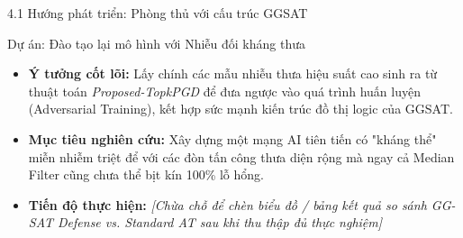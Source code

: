 \documentclass[10pt, xcolor=table]{beamer}
\begin{document}
\begin{frame}{4.1 Hướng phát triển: Phòng thủ với cấu trúc GGSAT}
    \begin{block}{Dự án: Đào tạo lại mô hình với Nhiễu đối kháng thưa}
        \begin{itemize}
            \item \textbf{Ý tưởng cốt lõi:} Lấy chính các mẫu nhiễu thưa hiệu suất cao sinh ra từ thuật toán \textit{Proposed-TopkPGD} để đưa ngược vào quá trình huấn luyện (Adversarial Training), kết hợp sức mạnh kiến trúc đồ thị logic của GGSAT.
            \item \textbf{Mục tiêu nghiên cứu:} Xây dựng một mạng AI tiên tiến có "kháng thể" miễn nhiễm triệt để với các đòn tấn công thưa diện rộng mà ngay cả Median Filter cũng chưa thể bịt kín 100\% lỗ hổng.
            \item \textbf{Tiến độ thực hiện:} \textit{[Chừa chỗ để chèn biểu đồ / bảng kết quả so sánh GG-SAT Defense vs. Standard AT sau khi thu thập đủ thực nghiệm]}
        \end{itemize}
    \end{block}
\end{frame}
\end{document}
